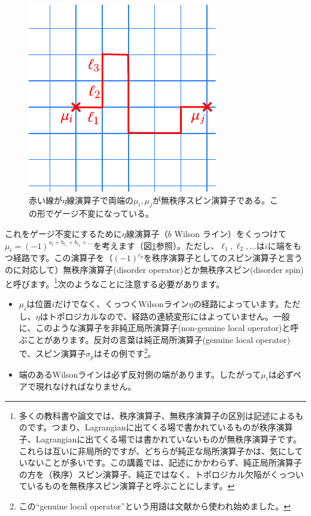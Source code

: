 \documentclass[report,paper=a4, fontsize=12pt, line_length=16cm, number_of_lines=33,dvipdfmx]{jlreq}
\numberwithin{equation}{chapter}
\begin{document}
\begin{figure}[htbp]
  \centering
  \includegraphics{disorder.pdf}
  \caption{赤い線が$\eta$線演算子で両端の$\mu_i,\mu_j$が無秩序スピン演算子である。この形でゲージ不変になっている。}
  \label{fig:disorder}
\end{figure}

これをゲージ不変にするために$\eta$線演算子（$b$ Wilson ライン）をくっつけて
$\mu_i=(-1)^{a_i+b_{\ell_1}+b_{\ell_2}+\dots}$を考えます（図\ref{fig:disorder}参照）。ただし、$\ell_1,\ell_2,\dots$は$i$に端をもつ経路です。この演算子を（$(-1)^{c_p}$を秩序演算子としてのスピン演算子と言うのに対応して）無秩序演算子(disorder operator)とか無秩序スピン(disorder spin)と呼びます。\footnote{多くの教科書や論文では、秩序演算子、無秩序演算子の区別は記述によるものです。つまり、Lagrangianに出てくる場で書かれているものが秩序演算子、Lagrangianに出てくる場では書かれていないものが無秩序演算子です。これらは互いに非局所的ですが、どちらが純正な局所演算子かは、気にしていないことが多いです。この講義では、記述にかかわらず、純正局所演算子の方を（秩序）スピン演算子、純正ではなく、トポロジカル欠陥がくっついているものを無秩序スピン演算子と呼ぶことにします。}次のようなことに注意する必要があります。
\begin{itemize}
  \item $\mu_i$は位置$i$だけでなく、くっつくWilsonライン$\eta$の経路によっています。ただし、$\eta$はトポロジカルなので、経路の連続変形にはよっていません。一般に、このような演算子を非純正局所演算子(non-genuine local operator)と呼ぶことがあります。反対の言葉は純正局所演算子(genuine local operator)で、スピン演算子$\sigma_{p}$はその例です\footnote{この``genuine local operator''という用語は文献\cite{Kapustin:2014gua}から使われ始めました。}。
  \item 端のあるWilsonラインは必ず反対側の端があります。したがって$\mu_i$は必ずペアで現れなければなりません。
\end{itemize}
\end{document}
